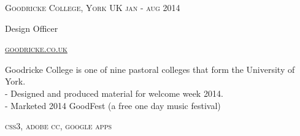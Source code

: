 {
    \textsc{\small{Goodricke College, York UK
        \hfill
            {\raggedleft
                jan - aug 2014
            } \\
        }
    }
    {\raggedright\large {
        Design Officer
    } \\}

    \textsc{\small\href{http://www.goodricke.com}{goodricke.co.uk}}

    \normalsize{
        Goodricke College is one of nine pastoral colleges that form the University of York.\\
        - Designed and produced material for welcome week 2014. \\
        - Marketed 2014 GoodFest (a free one day music festival)
    }

    \textsc{\small{\color{highlight}
        css3,
        adobe cc,
        google apps
    }}
}
